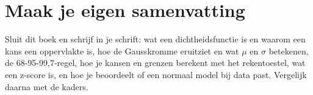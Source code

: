 
\begin{oefeningen}







\end{oefeningen}


\ifzelfstudie
\section*{Maak je eigen samenvatting}
Sluit dit boek en schrijf in je schrift: wat een dichtheidsfunctie is en waarom een kans een oppervlakte is, hoe de Gausskromme eruitziet en wat $\mu$ en $\sigma$ betekenen, de 68-95-99,7-regel, hoe je kansen en grenzen berekent met het rekentoestel, wat een z-score is, en hoe je beoordeelt of een normaal model bij data past. Vergelijk daarna met de kaders.
\fi
